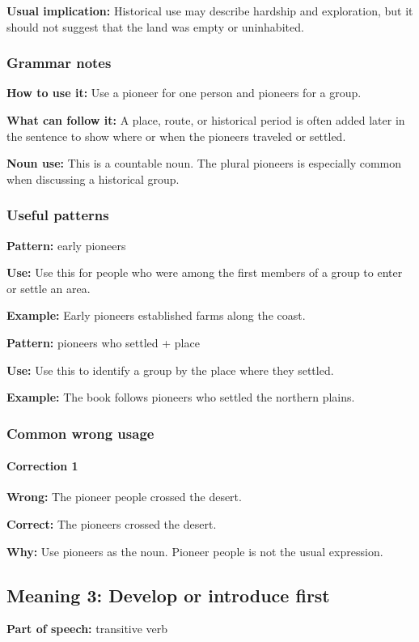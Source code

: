 \documentclass[11pt]{article}
\begin{document}
\textbf{Usual implication:} Historical use may describe hardship and exploration, but it should not suggest that the land was empty or uninhabited.

\subsubsection{Grammar notes}
\textbf{How to use it:} Use a pioneer for one person and pioneers for a group.

\textbf{What can follow it:} A place, route, or historical period is often added later in the sentence to show where or when the pioneers traveled or settled.

\textbf{Noun use:} This is a countable noun. The plural pioneers is especially common when discussing a historical group.

\subsubsection{Useful patterns}
\textbf{Pattern:} early pioneers

\textbf{Use:} Use this for people who were among the first members of a group to enter or settle an area.

\textbf{Example:} Early pioneers established farms along the coast.

\textbf{Pattern:} pioneers who settled + place

\textbf{Use:} Use this to identify a group by the place where they settled.

\textbf{Example:} The book follows pioneers who settled the northern plains.

\subsubsection{Common wrong usage}
\paragraph{Correction 1}
\textbf{Wrong:} The pioneer people crossed the desert.

\textbf{Correct:} The pioneers crossed the desert.

\textbf{Why:} Use pioneers as the noun. Pioneer people is not the usual expression.

\subsection{Meaning 3: Develop or introduce first}
\textbf{Part of speech:} transitive verb
\end{document}
